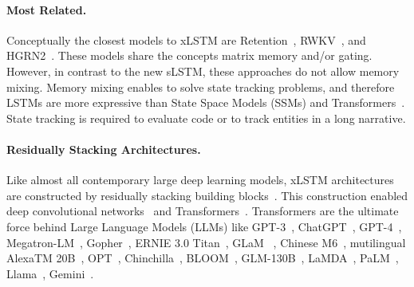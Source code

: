 \documentclass[dvipsnames]{article}
\begin{document}
\paragraph{Most Related.}
Conceptually the closest models to xLSTM are Retention~\citep{Sun:23arxiv},
RWKV~\citep{Peng:23arxivshort,Peng:24arxivshort}, 
and HGRN2~\citep{Qin:24arxiv}. 
These models share the concepts matrix memory and/or gating.
However, in contrast to the new sLSTM, these approaches do not allow memory mixing.
Memory mixing enables to solve state tracking problems,
and therefore LSTMs are more expressive 
than State Space Models (SSMs) and Transformers~\citep{Merrill:24,Deletang:23}.
State tracking is required to evaluate code or 
to track entities in a long narrative.

\paragraph{Residually Stacking Architectures.}
Like almost all contemporary large deep learning models,
xLSTM architectures are constructed 
by residually stacking building blocks~\citep{Srivastava:15,He:16}.
This construction enabled
deep convolutional networks~\citep{He:16} and
Transformers~\citep{Vaswani:17}. 
Transformers are the ultimate force behind  
Large Language Models (LLMs) like 
GPT-3~\citep{Brown:20short}, 
ChatGPT~\citep{Schulman:22short},
GPT-4~\citep{Achiam:23gpt4short},
Megatron-LM~\citep{Shoeybi:19},
Gopher~\citep{Rae:21short},
ERNIE 3.0 Titan~\citep{Wang:21arxivshort},
GLaM ~\citep{Du:21glamshort},
Chinese M6~\citep{Lin:21},
mutilingual AlexaTM 20B~\citep{Soltan:22},
OPT~\citep{Zhang:22opt},
Chinchilla~\citep{Hoffmann:22short},
BLOOM~\citep{Scao:22arxivshort},
GLM-130B~\citep{Zeng:22arxivshort},
LaMDA~\citep{Thoppilan:22short},
PaLM~\citep{Chowdhery:22short},
Llama~\citep{Touvron:23arxiv},
Gemini~\citep{GeminiTeam:23arxiv,Reid:24arxiv}.

\end{document}
